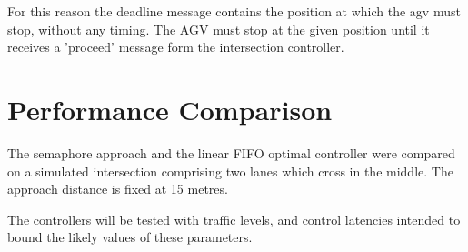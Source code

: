  For this reason the deadline message contains the position at which the agv must stop, without any timing. The AGV must stop at the given position until it receives a 'proceed' message form the intersection controller.
 
 \section{Performance Comparison}
 The semaphore approach and the linear FIFO optimal controller were compared on a simulated intersection comprising two lanes which cross in the middle. The approach distance is fixed at 15 metres.
 
The controllers will be tested with traffic levels, and control latencies intended to bound the likely values of these parameters. 